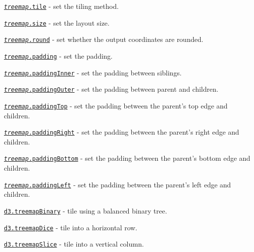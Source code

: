 \begin{DoxyItemize}
\item \href{https://github.com/d3/d3-hierarchy/blob/master/README.md#treemap_tile}{\tt {\itshape treemap}.tile} -\/ set the tiling method.
\item \href{https://github.com/d3/d3-hierarchy/blob/master/README.md#treemap_size}{\tt {\itshape treemap}.size} -\/ set the layout size.
\item \href{https://github.com/d3/d3-hierarchy/blob/master/README.md#treemap_round}{\tt {\itshape treemap}.round} -\/ set whether the output coordinates are rounded.
\item \href{https://github.com/d3/d3-hierarchy/blob/master/README.md#treemap_padding}{\tt {\itshape treemap}.padding} -\/ set the padding.
\item \href{https://github.com/d3/d3-hierarchy/blob/master/README.md#treemap_paddingInner}{\tt {\itshape treemap}.padding\+Inner} -\/ set the padding between siblings.
\item \href{https://github.com/d3/d3-hierarchy/blob/master/README.md#treemap_paddingOuter}{\tt {\itshape treemap}.padding\+Outer} -\/ set the padding between parent and children.
\item \href{https://github.com/d3/d3-hierarchy/blob/master/README.md#treemap_paddingTop}{\tt {\itshape treemap}.padding\+Top} -\/ set the padding between the parent’s top edge and children.
\item \href{https://github.com/d3/d3-hierarchy/blob/master/README.md#treemap_paddingRight}{\tt {\itshape treemap}.padding\+Right} -\/ set the padding between the parent’s right edge and children.
\item \href{https://github.com/d3/d3-hierarchy/blob/master/README.md#treemap_paddingBottom}{\tt {\itshape treemap}.padding\+Bottom} -\/ set the padding between the parent’s bottom edge and children.
\item \href{https://github.com/d3/d3-hierarchy/blob/master/README.md#treemap_paddingLeft}{\tt {\itshape treemap}.padding\+Left} -\/ set the padding between the parent’s left edge and children.
\item \href{https://github.com/d3/d3-hierarchy/blob/master/README.md#treemapBinary}{\tt d3.\+treemap\+Binary} -\/ tile using a balanced binary tree.
\item \href{https://github.com/d3/d3-hierarchy/blob/master/README.md#treemapDice}{\tt d3.\+treemap\+Dice} -\/ tile into a horizontal row.
\item \href{https://github.com/d3/d3-hierarchy/blob/master/README.md#treemapSlice}{\tt d3.\+treemap\+Slice} -\/ tile into a vertical column.

\end{DoxyItemize}
